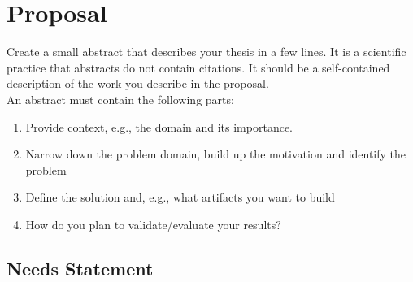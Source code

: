 \documentclass[
	pdftex,
	letterpaper,
	titlepage,
	final,
	oneside,
	11pt,
	DIV=calc,
]{scrbook}
\begin{document}
\frontmatter




\mainmatter

\chapter*{Proposal}

\begin{tcolorbox}[breakable]
	Create a small abstract that describes your thesis in a few lines.
	It is a scientific practice that abstracts do not contain citations.
	It should be a self-contained description of the work you describe in the proposal.
	\\
	An abstract must contain the following parts:
	\begin{enumerate}
		\item Provide context, e.g., the domain and its importance.
		\item Narrow down the problem domain, build up the motivation and identify the problem
		\item Define the solution and, e.g., what artifacts you want to build
		\item How do you plan to validate/evaluate your results?
	\end{enumerate}
\end{tcolorbox}

\section*{Needs Statement}
\end{document}
